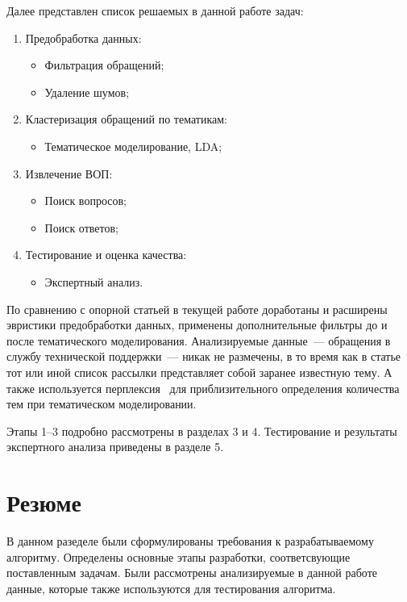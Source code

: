 Далее представлен список решаемых в данной работе задач:

\begin{enumerate}
\item Предобработка данных:
\begin{itemize}
\item Фильтрация обращений;
\item Удаление шумов;
\end{itemize}
\item Кластеризация обращений по тематикам:
\begin{itemize}
\item Тематическое моделирование, LDA;
\end{itemize}
\item Извлечение ВОП:
\begin{itemize}
\item Поиск вопросов;
\item Поиск ответов;
\end{itemize}
\item Тестирование и оценка качества:
\begin{itemize}
\item Экспертный анализ.
\end{itemize}
\end{enumerate}

По сравнению с опорной статьей в текущей работе доработаны и расширены эвристики предобработки данных, применены дополнительные фильтры до и после тематического моделирования. Анализируемые данные~--– обращения в службу технической поддержки~--– никак не размечены, в то время как в статье~\cite{original} тот или иной список рассылки представляет собой заранее известную тему. А также используется перплексия~\cite{LDA} для приблизительного определения количества тем при тематическом моделировании.

Этапы 1--3 подробно рассмотрены в разделах 3 и 4. Тестирование и результаты экспертного анализа приведены в разделе 5.

\section{Резюме}
\label{sec:task_concl}

В данном разеделе были сформулированы требования к разрабатываемому алгоритму. Определены основные этапы разработки, соответсвующие поставленным задачам. Были рассмотрены анализируемые в данной работе данные, которые также используются для тестирования алгоритма.